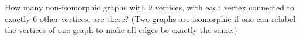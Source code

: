 How many non-isomorphic graphs with $9$ vertices, with each vertex connected to exactly $6$ other vertices, are there?  (Two graphs are isomorphic if one can relabel the vertices of one graph to make all edges be exactly the same.)